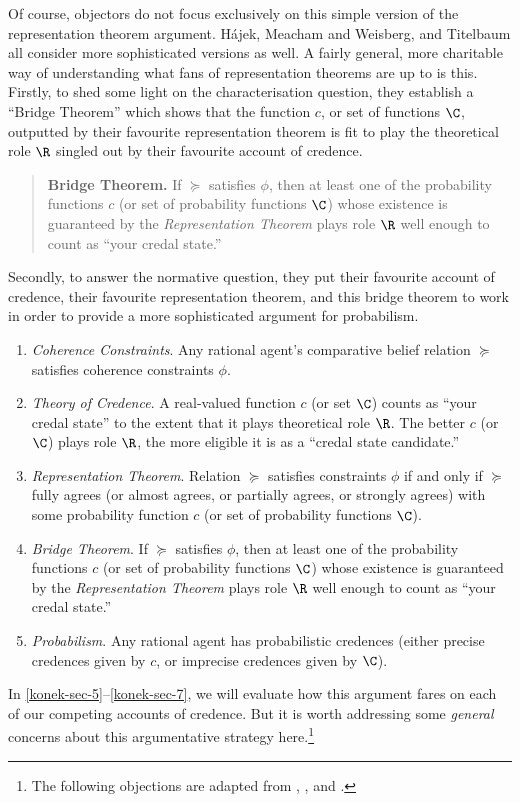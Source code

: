 Of course, objectors do not focus exclusively on this simple version of the representation theorem argument. H\'{a}jek, Meacham and Weisberg, and Titelbaum all consider more sophisticated versions as well. A fairly general, more charitable way of understanding what fans of representation theorems are up to is this. Firstly, to shed some light on the characterisation question, they establish a ``Bridge Theorem'' which shows that the function $c$, or set of functions $\C$, outputted by their favourite representation theorem is fit to play the theoretical role $\R$ singled out by their favourite account of credence.
\begin{quote}
\textbf{Bridge Theorem.} If $\succeq$ satisfies $\phi$, then at least one of the probability functions $c$ (or set of probability functions $\C$) whose existence is guaranteed by the \textit{Representation Theorem} plays role $\R$ well enough to count as ``your credal state.''
\end{quote}
Secondly, to answer the normative question, they put their favourite account of credence, their favourite representation theorem, and this bridge theorem to work in order to provide a more sophisticated argument for probabilism.
\begin{enumerate}
\item[1.] \textit{Coherence Constraints}. Any rational agent's comparative belief relation $\succeq$ satisfies coherence constraints $\phi$. 
\item[2.] \textit{Theory of Credence}. A real-valued function $c$ (or set $\C$) counts as ``your credal state'' to the extent that it plays theoretical role $\R$. The better $c$ (or $\C$) plays role $\R$, the more eligible it is as a ``credal state candidate.''
\item[3.] \textit{Representation Theorem}. Relation $\succeq$ satisfies constraints $\phi$ if and only if $\succeq$ fully agrees (or almost agrees, or partially agrees, or strongly agrees) with some probability function $c$ (or set of probability functions $\C$).
\item[4.] \textit{Bridge Theorem}. If $\succeq$ satisfies $\phi$, then at least one of the probability functions $c$ (or set of probability functions $\C$) whose existence is guaranteed by the \textit{Representation Theorem} plays role $\R$ well enough to count as ``your credal state.''
\item[C.] \textit{Probabilism}. Any rational agent has probabilistic credences (either precise credences given by $c$, or imprecise credences given by $\C$).
\end{enumerate}
In \autoref{konek-sec-5}--\ref{konek-sec-7}, we will evaluate how this argument fares on each of our competing accounts of credence. But it is worth addressing some \textit{general} concerns about this argumentative strategy here.\footnote{The following objections are adapted from \citet{Hajek2009b}, \citet{Meacham2011}, and \citet{Titelbaum2015}.}

